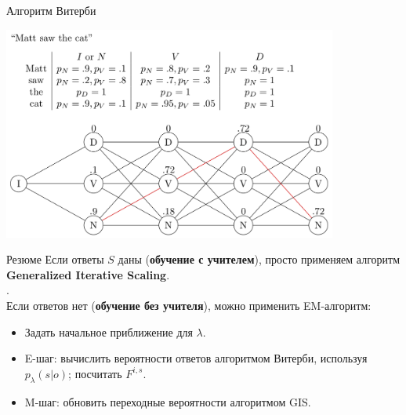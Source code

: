 \documentclass{beamer}
\begin{document}
\begin{frame}{Алгоритм Витерби}
\centerline{\includegraphics[width=11cm]{fig/9.png}}
\end{frame}

\begin{frame}{Резюме}
Если ответы $S$ даны (\textbf{обучение с учителем}), просто применяем алгоритм \textbf{Generalized Iterative Scaling}.\\
.\\
Если ответов нет (\textbf{обучение без учителя}), можно применить EM-алгоритм:
\begin{itemize}
\item Задать начальное приближение для $\lambda$.
\item E-шаг: вычислить вероятности ответов алгоритмом Витерби, используя $p_\lambda(s|o)$; посчитать $F^{i,s}$.
\item M-шаг: обновить переходные вероятности алгоритмом GIS.
\end{itemize}
\end{frame}
\end{document}
